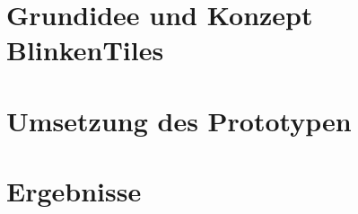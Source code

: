 







\tableofcontents


\clearpage
\section{Grundidee und Konzept BlinkenTiles}








\clearpage
\section{Umsetzung des Prototypen}










\clearpage
\section{Ergebnisse}




\clearpage





